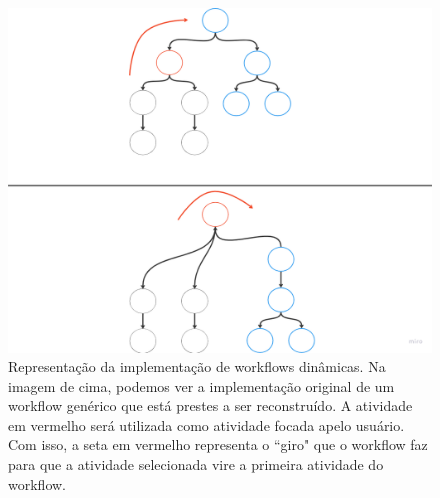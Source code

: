 \begin{figure}
    \centering
    \includegraphics[width=1\textwidth]{imgs/Implementacoes/primeiraImplementacao.png}
    \caption{Representação da implementação de workflows dinâmicas. Na imagem de cima, podemos ver a implementação original de um workflow genérico que está prestes a ser reconstruído. A atividade em vermelho será utilizada como atividade focada apelo usuário. Com isso, a seta em vermelho representa o ``giro" que o workflow faz para que a atividade selecionada vire a primeira atividade do workflow.}
    \label{fig:primeira_implementacao}
\end{figure}